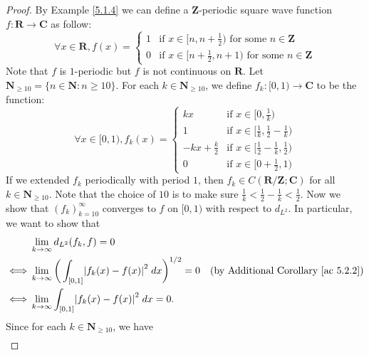 \begin{proof}
    By Example \ref{5.1.4} we can define a \(\mathbf{Z}\)-periodic square wave function \(f : \mathbf{R} \to \mathbf{C}\) as follow:
    \[
        \forall x \in \mathbf{R}, f(x) = \begin{cases}
            1 & \text{if } x \in [n, n + \frac{1}{2}) \text{ for some } n \in \mathbf{Z}     \\
            0 & \text{if } x \in [n + \frac{1}{2}, n + 1) \text{ for some } n \in \mathbf{Z}
        \end{cases}
    \]
    Note that \(f\) is \(1\)-periodic but \(f\) is not continuous on \(\mathbf{R}\).
    Let \(\mathbf{N}_{\geq 10} = \{n \in \mathbf{N} : n \geq 10\}\).
    For each \(k \in \mathbf{N}_{\geq 10}\), we define \(f_k : [0, 1) \to \mathbf{C}\) to be the function:
    \[
        \forall x \in [0, 1), f_k(x) = \begin{cases}
            kx                & \text{if } x \in [0, \frac{1}{k})                         \\
            1                 & \text{if } x \in [\frac{1}{k}, \frac{1}{2} - \frac{1}{k}) \\
            -kx + \frac{k}{2} & \text{if } x \in [\frac{1}{2} - \frac{1}{k}, \frac{1}{2}) \\
            0                 & \text{if } x \in [0 + \frac{1}{2}, 1)
        \end{cases}
    \]
    If we extended \(f_k\) periodically with period \(1\), then \(f_k \in C(\mathbf{R} / \mathbf{Z} ; \mathbf{C})\) for all \(k \in \mathbf{N}_{\geq 10}\).
    Note that the choice of \(10\) is to make sure \(\frac{1}{k} < \frac{1}{2} - \frac{1}{k} < \frac{1}{2}\).
    Now we show that \((f_k)_{k = 10}^\infty\) converges to \(f\) on \([0, 1)\) with respect to \(d_{L^2}\).
    In particular, we want to show that
    \begin{align*}
             & \lim_{k \to \infty} d_{L^2}(f_k, f) = 0                                                                                                  \\
        \iff & \lim_{k \to \infty} \bigg(\int_{[0, 1]} \abs*{f_k(x) - f(x)}^2 \; dx\bigg)^{1 / 2} = 0 & \text{(by Additional Corollary \ref{ac 5.2.2})} \\
        \iff & \lim_{k \to \infty} \int_{[0, 1]} \abs*{f_k(x) - f(x)}^2 \; dx = 0.
    \end{align*}
    Since for each \(k \in \mathbf{N}_{\geq 10}\), we have
    \begin{align*}

\end{align*}
\end{proof}
